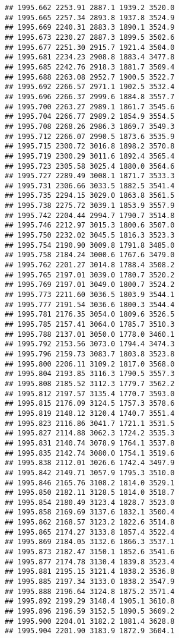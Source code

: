 \documentclass[
]{article}
\begin{document}
\begin{verbatim}
## 1995.662 2253.91 2887.1 1939.2 3520.0
## 1995.665 2257.34 2893.8 1937.8 3524.9
## 1995.669 2240.31 2883.3 1890.1 3524.9
## 1995.673 2230.27 2887.3 1899.5 3502.6
## 1995.677 2251.30 2915.7 1921.4 3504.0
## 1995.681 2234.23 2908.8 1883.4 3477.8
## 1995.685 2242.76 2918.3 1881.7 3509.4
## 1995.688 2263.08 2952.7 1900.5 3522.7
## 1995.692 2266.57 2971.1 1902.5 3532.4
## 1995.696 2266.37 2999.6 1884.8 3557.7
## 1995.700 2263.27 2989.1 1861.7 3545.6
## 1995.704 2266.77 2989.2 1854.9 3554.5
## 1995.708 2268.26 2986.3 1869.7 3549.3
## 1995.712 2266.07 2990.5 1873.6 3535.9
## 1995.715 2300.72 3016.8 1898.2 3570.8
## 1995.719 2300.29 3011.6 1892.4 3565.4
## 1995.723 2305.58 3025.4 1880.0 3564.6
## 1995.727 2289.49 3008.1 1871.7 3533.3
## 1995.731 2306.66 3033.5 1882.5 3541.4
## 1995.735 2294.15 3029.0 1863.8 3561.5
## 1995.738 2275.72 3039.1 1853.9 3557.9
## 1995.742 2204.44 2994.7 1790.7 3514.8
## 1995.746 2212.97 3015.3 1800.6 3507.0
## 1995.750 2232.02 3045.5 1816.3 3523.3
## 1995.754 2190.90 3009.8 1791.8 3485.0
## 1995.758 2184.24 3000.6 1767.6 3479.0
## 1995.762 2201.27 3014.8 1788.4 3508.2
## 1995.765 2197.01 3039.0 1780.7 3520.2
## 1995.769 2197.01 3049.0 1800.7 3524.2
## 1995.773 2211.60 3036.5 1803.9 3544.1
## 1995.777 2191.54 3036.6 1800.3 3544.4
## 1995.781 2176.35 3054.0 1809.6 3526.5
## 1995.785 2157.41 3064.0 1785.7 3510.3
## 1995.788 2137.01 3050.0 1778.0 3460.1
## 1995.792 2153.56 3073.0 1794.4 3474.3
## 1995.796 2159.73 3083.7 1803.8 3523.8
## 1995.800 2206.11 3109.2 1817.0 3568.0
## 1995.804 2193.85 3116.3 1790.5 3557.3
## 1995.808 2185.52 3112.3 1779.7 3562.2
## 1995.812 2197.57 3135.4 1770.7 3593.0
## 1995.815 2176.09 3124.5 1757.3 3578.6
## 1995.819 2148.12 3120.4 1740.7 3551.4
## 1995.823 2116.86 3041.7 1721.1 3531.5
## 1995.827 2114.88 3062.3 1724.2 3535.3
## 1995.831 2140.74 3078.9 1764.1 3537.8
## 1995.835 2142.74 3080.0 1754.1 3519.6
## 1995.838 2112.01 3026.6 1742.4 3497.9
## 1995.842 2149.71 3057.9 1795.3 3510.0
## 1995.846 2165.76 3108.2 1814.0 3529.1
## 1995.850 2182.11 3128.5 1814.0 3518.7
## 1995.854 2180.49 3123.4 1828.7 3523.0
## 1995.858 2169.69 3137.6 1832.1 3500.4
## 1995.862 2168.57 3123.2 1822.6 3514.8
## 1995.865 2174.27 3133.8 1857.4 3522.4
## 1995.869 2184.05 3132.6 1866.3 3537.1
## 1995.873 2182.47 3150.1 1852.6 3541.6
## 1995.877 2174.78 3130.4 1839.8 3523.4
## 1995.881 2195.15 3121.4 1838.2 3536.8
## 1995.885 2197.34 3133.0 1838.2 3547.9
## 1995.888 2196.64 3124.8 1875.2 3571.4
## 1995.892 2199.29 3148.4 1905.1 3610.8
## 1995.896 2196.59 3152.5 1890.5 3609.2
## 1995.900 2204.01 3182.2 1881.4 3628.8
## 1995.904 2201.90 3183.9 1872.9 3604.1

\end{verbatim}
\end{document}
